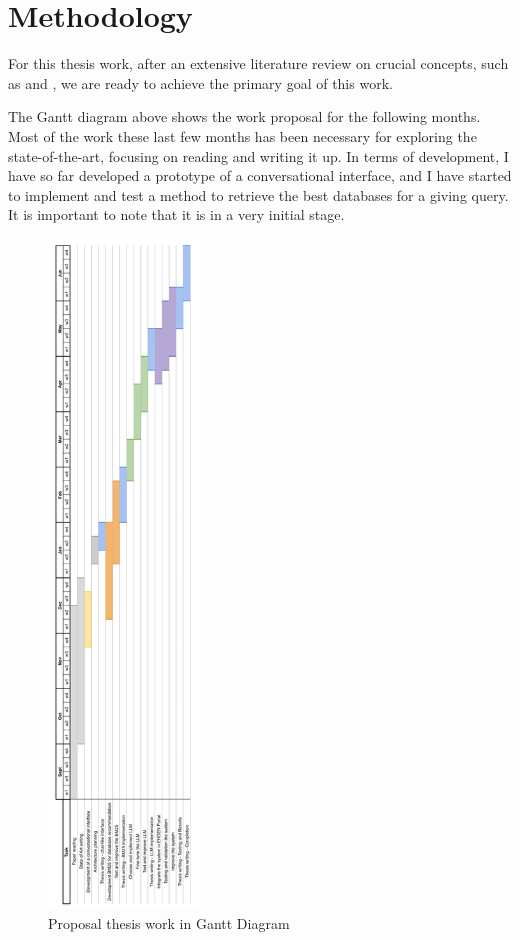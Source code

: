 \chapter{Methodology}
\label{chapter:Methodology}

For this thesis work, after an extensive literature review on crucial concepts, such as {\ir} and {\llm}, we are ready to achieve the primary goal of this work.

The Gantt diagram above shows the work proposal for the following months. Most of the work these last few months has been necessary for exploring the state-of-the-art, focusing on reading and writing it up. In terms of development, I have so far developed a prototype of a conversational interface, and I have started to implement and test a {\bm} method to retrieve the best databases for a giving query. It is important to note that it is in a very initial stage.


\begin{figure}[ht]
    \includegraphics[width=4cm]{figs/chapter3/diagrama_gantt_vert.png}
    \centering
    \caption{Proposal thesis work in Gantt Diagram}
\end{figure}